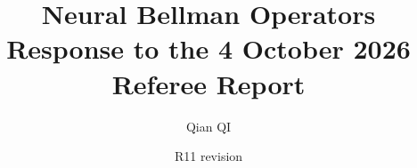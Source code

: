 \documentclass[11pt]{article}
\begin{document}
\title{Neural Bellman Operators\\Response to the 4 October 2026 Referee Report}
\author{Qian QI}\date{R11 revision}
\maketitle

\end{document}

